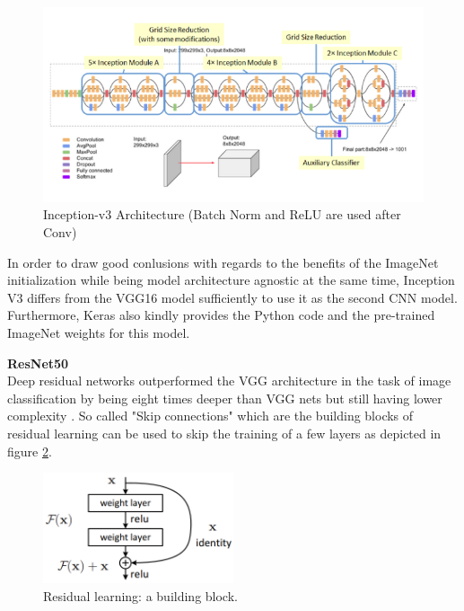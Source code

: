\documentclass{article}
\theoremstyle{definition}
\theoremstyle{remark}
\begin{document}
\begin{figure}[h!]
    \centering
    \includegraphics[width=1\textwidth]{img/inception.png}
    \caption{Inception-v3 Architecture (Batch Norm and ReLU are used after Conv)}
    \label{fig:inception}
\end{figure}


In order to draw good conlusions with regards to the benefits of the ImageNet initialization while being model architecture agnostic at the same time, Inception V3 differs from the VGG16 model sufficiently to use it as the second CNN model. Furthermore, Keras also kindly provides the Python code and the pre-trained ImageNet weights for this model.\\
\newpage

\noindent\textbf{ResNet50}\\

Deep residual networks outperformed the VGG architecture in the task of image classification by being eight times deeper than VGG nets but still having lower complexity \cite{he2016deep}. So called "Skip connections" which are the building blocks of residual learning can be used to skip the training of a few layers as depicted in figure \ref{fig:skip_connection}.


\begin{figure}[h!]
    \centering
    \includegraphics[width=0.5\textwidth]{img/skip_connections.png}
    \caption{Residual learning: a building block.}
    \label{fig:skip_connection}
\end{figure}
\end{document}
